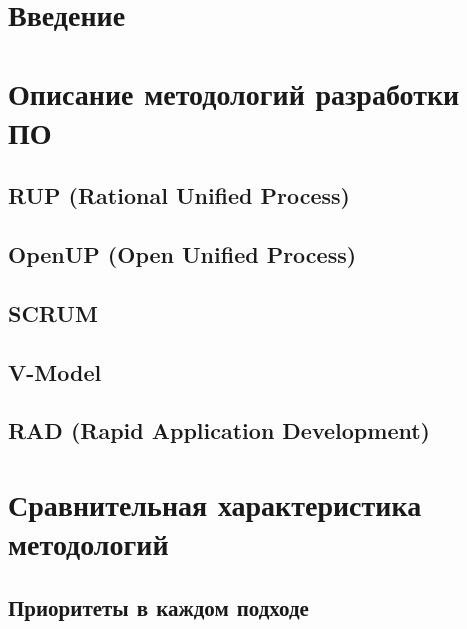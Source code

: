\documentclass[a4paper]{article}
\begin{document}


\tableofcontents

\newpage

\section*{Введение}


\newpage

\section{Описание методологий разработки ПО}

\subsection{RUP (Rational Unified Process)}


\subsection{OpenUP (Open Unified Process)}


\subsection{SCRUM}


\subsection{V-Model}


\subsection{RAD (Rapid Application Development)}


\newpage

\section{Сравнительная характеристика методологий}

\subsection{Приоритеты в каждом подходе}

\end{document}
